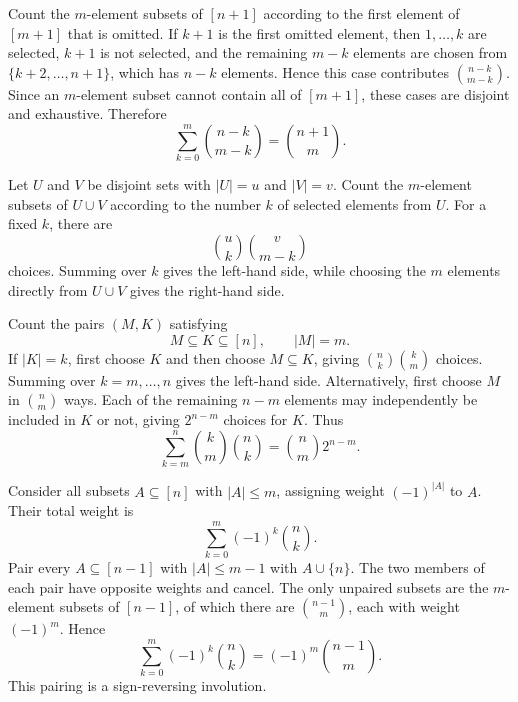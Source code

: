 \documentclass[11pt,oneside]{article}
\begin{document}
\begin{solution}[1]
\begin{problemsubparts}
    \item Count the $m$-element subsets of $[n+1]$ according to the first element of $[m+1]$ that is omitted. If $k+1$ is the first omitted element, then $1,\ldots,k$ are selected, $k+1$ is not selected, and the remaining $m-k$ elements are chosen from $\{k+2,\ldots,n+1\}$, which has $n-k$ elements. Hence this case contributes $\binom{n-k}{m-k}$. Since an $m$-element subset cannot contain all of $[m+1]$, these cases are disjoint and exhaustive. Therefore
    \[
        \sum_{k=0}^{m}\binom{n-k}{m-k}
        =\binom{n+1}{m}.
    \]

    \item Let $U$ and $V$ be disjoint sets with $|U|=u$ and $|V|=v$. Count the $m$-element subsets of $U\cup V$ according to the number $k$ of selected elements from $U$. For a fixed $k$, there are
    \[
        \binom{u}{k}\binom{v}{m-k}
    \]
    choices. Summing over $k$ gives the left-hand side, while choosing the $m$ elements directly from $U\cup V$ gives the right-hand side.

    \item Count the pairs $(M,K)$ satisfying
    \[
        M\subseteq K\subseteq[n],
        \qquad
        |M|=m.
    \]
    If $|K|=k$, first choose $K$ and then choose $M\subseteq K$, giving $\binom{n}{k}\binom{k}{m}$ choices. Summing over $k=m,\ldots,n$ gives the left-hand side. Alternatively, first choose $M$ in $\binom{n}{m}$ ways. Each of the remaining $n-m$ elements may independently be included in $K$ or not, giving $2^{n-m}$ choices for $K$. Thus
    \[
        \sum_{k=m}^{n}\binom{k}{m}\binom{n}{k}
        =\binom{n}{m}2^{n-m}.
    \]

    \item Consider all subsets $A\subseteq[n]$ with $|A|\leq m$, assigning weight $(-1)^{|A|}$ to $A$. Their total weight is
    \[
        \sum_{k=0}^{m}(-1)^k\binom{n}{k}.
    \]
    Pair every $A\subseteq[n-1]$ with $|A|\leq m-1$ with $A\cup\{n\}$. The two members of each pair have opposite weights and cancel. The only unpaired subsets are the $m$-element subsets of $[n-1]$, of which there are $\binom{n-1}{m}$, each with weight $(-1)^m$. Hence
    \[
        \sum_{k=0}^{m}(-1)^k\binom{n}{k}
        =(-1)^m\binom{n-1}{m}.
    \]
    This pairing is a sign-reversing involution.
\end{problemsubparts}
\end{solution}
\end{document}

